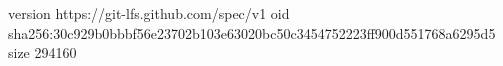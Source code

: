 version https://git-lfs.github.com/spec/v1
oid sha256:30c929b0bbbf56e23702b103e63020bc50c3454752223ff900d551768a6295d5
size 294160
